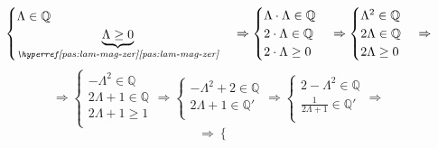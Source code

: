 \begin{enumerate}
\begin{demonstration}
\begin{enumerate}[label=(\roman*)]
\begin{enumerate}[label=\arabic*.]
\begin{enumerate}[label=\arabic{enumiii}.\arabic*.]
                    \[ 
                        \begin{cases}
                            \Lambda \in \mathbb{Q} \\
                            \underbrace{\Lambda \geq 0}_{\pasref{pas:lam-mag-zer}} \\
                        \end{cases}\Rightarrow
                        \begin{cases}
                            \Lambda\cdot\Lambda \in \mathbb{Q} \\
                            2\cdot\Lambda \in \mathbb{Q} \\
                            2\cdot\Lambda  \geq 0 \\
                        \end{cases}\Rightarrow
                        \begin{cases}
                            \Lambda^2 \in \mathbb{Q} \\
                            2\Lambda \in \mathbb{Q} \\
                            2\Lambda  \geq 0 \\
                        \end{cases}\Rightarrow\]\[\Rightarrow
                        \begin{cases}
                            - \Lambda^2 \in \mathbb{Q} \\
                            2\Lambda + 1 \in \mathbb{Q} \\
                            2\Lambda + 1  \geq 1 \\
                        \end{cases}\Rightarrow
                        \begin{cases}
                            - \Lambda^2 + 2 \in \mathbb{Q} \\
                            2\Lambda + 1 \in \mathbb{Q}' \\
                        \end{cases}\Rightarrow
                        \begin{cases}
                            2 - \Lambda^2 \in \mathbb{Q} \\
                            \frac{1}{2\Lambda + 1} \in \mathbb{Q}' \\
                        \end{cases}\Rightarrow\]\[\Rightarrow
                        \begin{cases}

\end{cases}\]
\end{enumerate}
\end{enumerate}
\end{enumerate}
\end{demonstration}
\end{enumerate}
